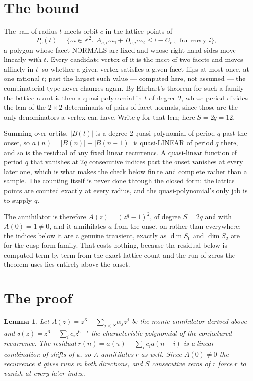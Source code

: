 \documentclass[11pt,a4paper]{article}
\theoremstyle{plain}
\newtheorem{lemma}[theorem]{Lemma}
\theoremstyle{definition}
\begin{document}
\section{The bound}

The ball of radius $t$ meets orbit $c$ in the lattice points of
\[
P_c(t)=\{m\in\mathbb{Z}^2:\;A_{c,i}m_1+B_{c,i}m_2\le t-C_{c,i}\ \text{ for every } i\},
\]
a polygon whose facet NORMALS are fixed and whose right-hand sides move linearly with $t$.
Every candidate vertex of it is the meet of two facets and moves affinely in $t$, so whether a
given vertex satisfies a given facet flips at most once, at one rational $t$; past the largest
such value --- computed here, not assumed --- the combinatorial type never changes again. By
Ehrhart's theorem for such a family the lattice count is then a quasi-polynomial in $t$ of
degree $2$, whose period divides the lcm of the $2\times2$ determinants of pairs of facet
normals, since those are the only denominators a vertex can have. Write $q$ for that lcm;
here $S=2q=12$.

Summing over orbits, $|B(t)|$ is a degree-$2$ quasi-polynomial of period $q$ past the onset,
so $a(n)=|B(n)|-|B(n-1)|$ is quasi-LINEAR of period $q$ there, and so is the residual of any
fixed linear recurrence. A quasi-linear function of period $q$ that vanishes at $2q$
consecutive indices past the onset vanishes at every later one, which is what makes the check
below finite and complete rather than a sample. The counting itself is never done through the
closed form: the lattice points are counted exactly at every radius, and the quasi-polynomial's
only job is to supply $q$.

The annihilator is therefore $A(z)=(z^{q}-1)^2$, of degree $S=2q$ and with $A(0)=1\ne0$, and
it annihilates $a$ from the onset on rather than everywhere: the indices below it are a
genuine transient, exactly as $\dim S_0$ and $\dim S_2$ are for the cusp-form family. That
costs nothing, because the residual below is computed term by term from the exact lattice
count and the run of zeros the theorem uses lies entirely above the onset.

\section{The proof}

\begin{lemma}\label{lem:crit}
Let $A(z)=z^S-\sum_{j<S}\alpha_jz^{j}$ be the monic annihilator derived above and
$q(z)=z^{6}-\sum_ic_iz^{6-i}$ the characteristic polynomial of the conjectured
recurrence. The residual $r(n)=a(n)-\sum_ic_ia(n-i)$ is a linear combination of shifts of $a$,
so $A$ annihilates $r$ as well. Since $A(0)\ne0$ the recurrence it gives runs in both
directions, and $S$ consecutive zeros of $r$ force $r$ to vanish at every later index.
\end{lemma}
\end{document}
